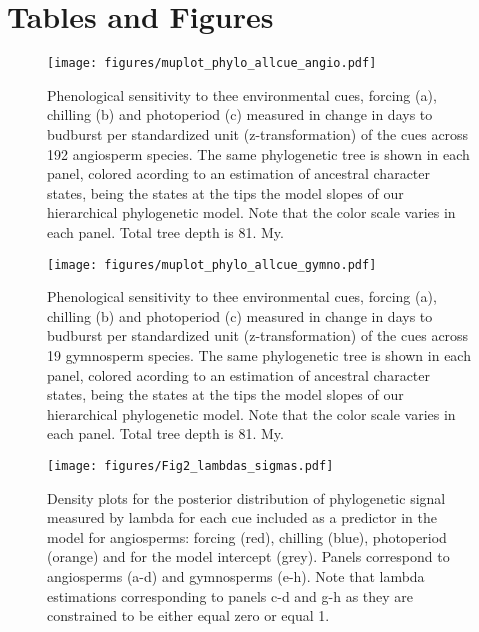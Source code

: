 \documentclass{article}\usepackage[]{graphicx}\usepackage[]{color}
\begin{document}
\section*{Tables and Figures} 


\begin{figure} [H]
  \begin{center}
  \texttt{[image: figures/muplot\_phylo\_allcue\_angio.pdf]}
  \caption{Phenological sensitivity to thee environmental cues, forcing (a), chilling (b) and photoperiod (c) measured in change in days to budburst per standardized unit (z-transformation) of the cues across 192 angiosperm species. The same phylogenetic tree is shown in each panel, colored acording to an estimation of ancestral character states, being the states at the tips the model slopes of our hierarchical phylogenetic model. Note that the color scale varies in each panel. Total tree depth is 81. My.}
  \label{fig:muplot_all}
  \end{center}
\end{figure}

\begin{figure} [H]
  \begin{center}
  \texttt{[image: figures/muplot\_phylo\_allcue\_gymno.pdf]}
  \caption{Phenological sensitivity to thee environmental cues, forcing (a), chilling (b) and photoperiod (c) measured in change in days to budburst per standardized unit (z-transformation) of the cues across 19 gymnosperm species. The same phylogenetic tree is shown in each panel, colored acording to an estimation of ancestral character states, being the states at the tips the model slopes of our hierarchical phylogenetic model. Note that the color scale varies in each panel. Total tree depth is 81. My.}
  \label{fig:muplot_allgymno}
  \end{center}
\end{figure}


\begin{figure} [H]
  \begin{center}
  \texttt{[image: figures/Fig2\_lambdas\_sigmas.pdf]}
  \caption{Density plots for the posterior distribution of phylogenetic signal measured by lambda for each cue included as a predictor in the model for angiosperms: forcing (red), chilling (blue),  photoperiod (orange) and for the model intercept (grey). Panels correspond to angiosperms (a-d) and gymnosperms (e-h). Note that lambda estimations corresponding to  panels c-d and g-h as they are constrained to be either equal zero or equal 1.}
  \label{fig:phylosig_all}
  \end{center}
\end{figure}
\end{document}
